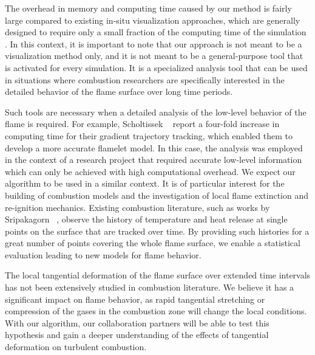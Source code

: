 %
The overhead in memory and computing time caused by our method is fairly large
compared to existing in-situ visualization approaches, which are generally
designed to require only a small fraction of the computing time of the
simulation \cite{Ma2009}.
%
In this context, it is important to note that our approach is not meant to be a
visualization method only, and it is not meant to be a general-purpose tool that
is activated for every simulation.
%
It is a specialized analysis tool that can be used in situations where
combustion researchers are specifically interested in the detailed behavior of
the flame surface over long time periods.
%

%
Such tools are necessary when a detailed analysis of the low-level behavior
of the flame is required.
%
For example, Scholtissek \etal~\cite{Scholtissek2017} report a four-fold
increase in computing time for their gradient trajectory tracking, which enabled
them to develop a more accurate flamelet model.
%
In this case, the analysis was employed in the context of a research project
that required accurate low-level information which can only be achieved with
high computational overhead.
%
We expect our algorithm to be used in a similar context.
%
It is of particular interest for the building of combustion models and the
investigation of local flame extinction and re-ignition mechanics.
%
Existing combustion literature, such as works by Sripakagorn
\etal~\cite{Sripakagorn2004}, observe the history of temperature and heat
release at single points on the surface that are tracked over time.
%
By providing such histories for a great number of points covering the whole
flame surface, we enable a statistical evaluation leading to new models for
flame behavior.
%

%
The local tangential deformation of the flame surface over extended time
intervals has not been extensively studied in combustion literature.
%
We believe it has a significant impact on flame behavior, as rapid tangential
stretching or compression of the gases in the combustion zone will change the
local conditions.
%
With our algorithm, our collaboration partners will be able to test this
hypothesis and gain a deeper understanding of the effects of tangential
deformation on turbulent combustion.
%
